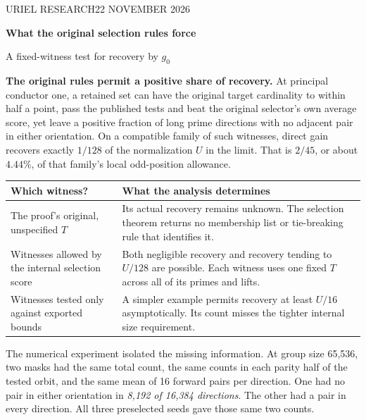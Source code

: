 \documentclass[12pt,letterpaper]{article}
\begin{document}
\thispagestyle{plain}
{\sffamily\small\color{accent}URIEL RESEARCH\hfill 22 NOVEMBER 2026}\par\vspace{12pt}
{\Huge\bfseries\color{ink}What the original selection rules force\par}\vspace{5pt}
{\Large\color{muted}A fixed-witness test for recovery by \(g_0\)}\par\bigskip

\textbf{The original rules permit a positive share of recovery.} At principal conductor one, a retained set can have the original target cardinality to within half a point, pass the published tests and beat the original selector's own average score, yet leave a positive fraction of long prime directions with no adjacent pair in either orientation. On a compatible family of such witnesses, direct gain recovers exactly \(1/128\) of the normalization \(U\) in the limit. That is \(2/45\), or about \(4.44\%\), of that family's local odd-position allowance.

\begin{center}\begin{tabularx}{\linewidth}{@{}p{.36\linewidth}Y@{}}\toprule
Which witness? & What the analysis determines\\\midrule
The proof's original, unspecified \(T\) & Its actual recovery remains unknown. The selection theorem returns no membership list or tie-breaking rule that identifies it.\\
Witnesses allowed by the internal selection score & Both negligible recovery and recovery tending to \(U/128\) are possible. Each witness uses one fixed \(T\) across all of its primes and lifts.\\
Witnesses tested only against exported bounds & A simpler example permits recovery at least \(U/16\) asymptotically. Its count misses the tighter internal size requirement.\\\bottomrule
\end{tabularx}\end{center}

The numerical experiment isolated the missing information. At group size 65,536, two masks had the same total count, the same counts in each parity half of the tested orbit, and the same mean of 16 forward pairs per direction. One had no pair in either orientation in \emph{8,192 of 16,384 directions}. The other had a pair in every direction. All three preselected seeds gave those same two counts.
\end{document}
